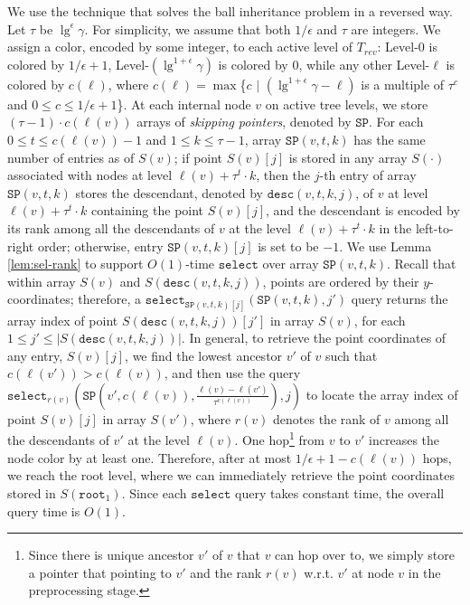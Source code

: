 \documentclass[smallabstract,smallcaptions]{dccpaper}
\def\idtt#1{\ensuremath{\mathtt{#1}}}
\def\select{\idtt{select}}
\def\sp{\idtt{SP}}
\def\root{\idtt{root}}
\def\desc{\idtt{desc}}
\begin{document}
We use the technique that solves the ball inheritance problem in a reversed way.
Let $\tau$ be $\lg^{\epsilon} \gamma$. For simplicity, we assume that both $1/\epsilon$ and $\tau$ are integers.
We assign a color, encoded by some integer, to each active level of $T_{rev}$: Level-0 is colored by $1/\epsilon+1$, Level-$(\lg^{1+\epsilon} \gamma)$ is colored by $0$, while any other Level-$\ell$ is colored by $c(\ell)$, where $c(\ell)=\max$\{$c$ $|$ $(\lg^{1+\epsilon} \gamma - \ell)$ is a multiple of $\tau^c$ and  $0\leq c\leq 1/\epsilon+1$\}.
At each internal node $v$ on active tree levels, we store $(\tau-1)\cdot c(\ell(v))$ arrays of {\em skipping pointers}, denoted by $\sp$.
For each $0\le t\le c(\ell(v))-1$ and $1\le k \le \tau-1$, array $\sp(v, t, k)$ has the same number of entries as of $S(v)$; if point $S(v)[j]$ is stored in any array $S(\cdot)$ associated with nodes at level $\ell(v)+\tau^t\cdot k$, then the $j$-th entry of array $\sp(v, t, k)$ stores the descendant, denoted by $\desc(v, t, k, j)$, of $v$ at level $\ell(v)+\tau^t\cdot k$ containing the point $S(v)[j]$, and the descendant is encoded by its rank among all the descendants of $v$ at the level $\ell(v)+\tau^t\cdot k$ in the left-to-right order; otherwise, entry $\sp(v, t, k)[j]$ is set to be $-1$.
We use Lemma \ref{lem:sel-rank} to support $O(1)$-time $\select$ over array $\sp(v,t, k)$.
Recall that within array $S(v)$ and $S(\desc(v, t, k, j))$, points are ordered by their $y$-coordinates; therefore, a $\select_{\sp(v, t, k)[j]}(\sp(v, t, k), j')$ query returns the array index of point $S(\desc(v, t, k, j))[j']$ in array $S(v)$, for each $1\le j' \le |S(\desc(v, t, k, j))|$. %
In general, to retrieve the point coordinates of any entry, $S(v)[j]$, we find the lowest ancestor $v'$ of $v$ such that $c(\ell(v'))>c(\ell(v))$, and then use the query $\select_{r(v)}(\sp(v', c(\ell(v)), \frac{\ell(v)-\ell(v')}{\tau^{c(\ell(v))}}), j)$ to locate the array index of point $S(v)[j]$ in array $S(v')$, where $r(v)$ denotes the rank of $v$ among all the descendants of $v'$ at the level $\ell(v)$. 
One hop\footnote{Since there is unique ancestor $v'$ of $v$ that $v$ can hop over to, we simply store a pointer that pointing to $v'$ and the rank $r(v)$ w.r.t. $v'$ at node $v$ in the preprocessing stage.} from $v$ to $v'$ increases the node color by at least one.
Therefore, after at most $1/\epsilon+1 - c(\ell(v))$ hops, we reach the root level, where we can immediately retrieve the point coordinates stored in $S(\root_1)$.
Since each $\select$ query takes constant time, the overall query time is $O(1)$.
\end{document}
